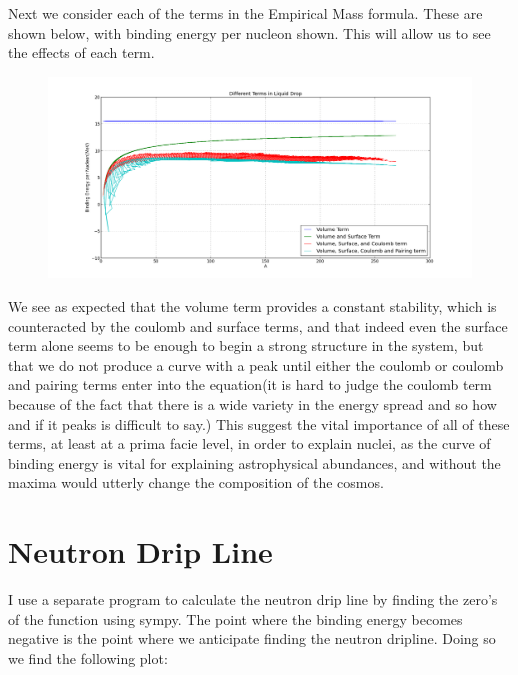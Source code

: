 \documentclass[11pt]{article} %
\begin{document}
Next we consider each of the terms in the Empirical Mass formula. These are shown below, with binding energy per nucleon shown. 
This will allow us to see the effects of each term. 


\vspace{1mm}
\begin{figure}[h]
\centering
\includegraphics[width=\linewidth]{"LiquidDropTerms"}
\end{figure}
\vspace{1mm}

We see as expected that the volume term provides a constant stability, which is counteracted by the coulomb and surface terms, and that indeed even the surface term alone seems to be enough to begin a strong structure in the system, but that we do not produce a curve with a peak until either the coulomb or coulomb and pairing terms enter into the equation(it is hard to judge the coulomb term because of the fact that there is a wide variety in the energy spread and so how and if it peaks is difficult to say.) This suggest the vital importance of all of these terms, at least at a prima facie level, in order to explain nuclei, as  the curve of binding energy is vital for explaining astrophysical abundances, and without the maxima would utterly change the composition of the cosmos.\\
\newpage

\section{Neutron Drip Line}

I use a separate program to calculate the neutron drip line by finding the zero's of the function using sympy. The point where the binding energy becomes negative is the point where we anticipate finding the neutron dripline. Doing so we find the following plot:\\
\end{document}

